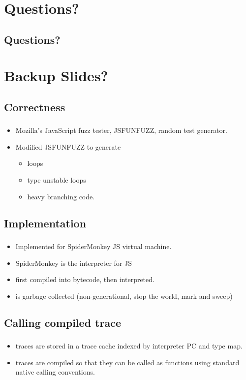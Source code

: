 \documentclass[mathserif,10pt]{beamer}
\begin{document}
\section{Questions?}
\subsection{Questions?}
\frame
{}

\section{Backup Slides?}
\subsection{Correctness}
\frame
{
  \frametitle{\subsecname}
  \begin{itemize}
    \item Mozilla’s JavaScript fuzz tester, JSFUNFUZZ, random test generator.
    \item Modified JSFUNFUZZ to generate
    \begin{itemize}
      \item loops
      \item type unstable loops
      \item heavy branching code.
    \end{itemize}
  \end{itemize}
}
\subsection{Implementation}
\frame
{
  \frametitle{\subsecname}
  \begin{itemize}
    \item Implemented for SpiderMonkey JS virtual machine.
    \item SpiderMonkey is the interpreter for JS
    \item first compiled into bytecode, then interpreted.
    \item is garbage collected (non-generational, stop the world, mark and sweep)
  \end{itemize}  
}
\subsection{Calling compiled trace}
\frame
{
  \frametitle{\subsecname}
  \begin{itemize}
    \item traces are stored in a trace cache indexed by interpreter PC and type map.
    \item traces are compiled so that they can be called as functions using standard native calling conventions.
  \end{itemize}  
}
\end{document}
